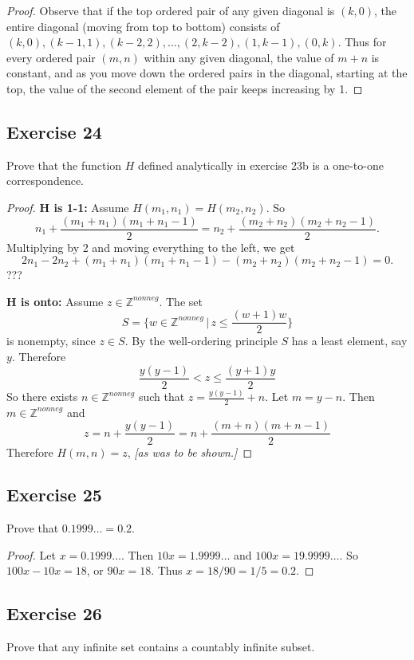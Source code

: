 \documentclass[14pt]{extarticle}
\newcommand{\dps}{\displaystyle}
\newcommand{\Z}{\mathbb{Z}}
\begin{document}
\begin{proof}
Observe that if the top ordered pair of any given diagonal is $(k, 0)$, the entire diagonal (moving from top to 
bottom) consists of \((k, 0), (k - 1, 1), (k - 2, 2), \ldots, (2, k - 2), (1, k - 1), (0, k)\). Thus for every 
ordered pair \((m, n)\) within any given diagonal, the value of \(m + n\) is constant, and as you move down the 
ordered pairs in the diagonal, starting at the top, the value of the second element of the pair keeps increasing by 1.
\end{proof}

\subsection{Exercise 24}
Prove that the function $H$ defined analytically in exercise 23b is a one-to-one correspondence.

\begin{proof}
{\bf $\bm{H}$ is 1-1:} Assume \(H(m_1, n_1) = H(m_2, n_2)\). So
\[
n_1 + \frac{(m_1 + n_1)(m_1 + n_1 - 1)}{2} = n_2 + \frac{(m_2 + n_2)(m_2 + n_2 - 1)}{2}.
\]
Multiplying by 2 and moving everything to the left, we get
\[
2n_1 - 2n_2 + (m_1 + n_1)(m_1 + n_1 - 1) - (m_2 + n_2)(m_2 + n_2 - 1) = 0.
\]
???

{\bf $\bm{H}$ is onto:} Assume \(z \in \Z^{nonneg}\). The set
\[
S = \{w \in \Z^{nonneg} \, | \, z \leq \frac{(w+1)w}{2}\}
\]
is nonempty, since \(z \in S\). By the well-ordering principle $S$ has a least element, say $y$. Therefore
\[
\frac{y(y-1)}{2} < z \leq \frac{(y+1)y}{2}
\]
So there exists \(n \in \Z^{nonneg}\) such that \(\dps z = \frac{y(y-1)}{2} + n\). Let \(m = y - n\). Then \(m \in \Z^{nonneg}\) and
\[
z = n + \frac{y(y-1)}{2} = n + \frac{(m+n)(m+n-1)}{2}
\]
Therefore \(H(m, n) = z\), {\it [as was to be shown.]}
\end{proof}

\subsection{Exercise 25}
Prove that \(0.1999 \ldots = 0.2\).

\begin{proof}
Let \(x = 0.1999 \ldots\). Then \(10x = 1.9999 \ldots\) and \(100x = 19.9999 \ldots\). So \(100x - 10x = 18\), or
\(90x = 18\). Thus \(x = 18/90 = 1/5 = 0.2\).
\end{proof}

\subsection{Exercise 26}
Prove that any infinite set contains a countably infinite subset.
\end{document}
